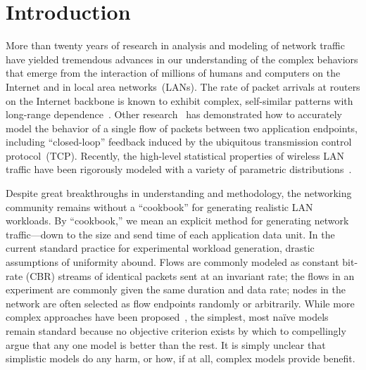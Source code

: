 \documentclass[conference]{IEEEtran}
\newcommand{\caps}[1]{{\small{#1}}}
\begin{document}
\section{Introduction}\label{sec:intro}



More than twenty years of research in analysis and modeling of network traffic have yielded tremendous advances in our understanding of the complex behaviors that emerge from the interaction of millions of humans and computers on the Internet and in local area networks~(\caps{LAN}s). The rate of packet arrivals at routers on the Internet backbone is known to exhibit complex, self-similar patterns with long-range dependence~\cite{Paxson95,Paxson96,Willinger98}. Other research~\cite{Hernandez06:dissertation} has demonstrated how to accurately model the behavior of a single flow of packets between two application endpoints, including ``closed-loop'' feedback induced by the ubiquitous transmission control protocol~(\caps{TCP}). Recently, the high-level statistical properties of wireless \caps{LAN} traffic have been rigorously modeled with a variety of parametric distributions~\cite{Hernandez06:wlan-traffic}.

Despite great breakthroughs in understanding and methodology, the networking community remains without a ``cookbook'' for generating realistic \caps{LAN} workloads. By ``cookbook,'' we mean an explicit method for generating network traffic---down to the size and send time of each application data unit. In the current standard practice for experimental workload generation, drastic assumptions of uniformity abound. Flows are commonly modeled as constant bit-rate (\caps{CBR}) streams of identical packets sent at an invariant rate; the flows in an experiment are commonly given the same duration and data rate; nodes in the network are often selected as flow endpoints randomly or arbitrarily. While more complex approaches have been proposed~\cite{Sommers04,Avallone04,Avallone06}, %
the simplest, most na\"ive models remain standard because no objective criterion exists by which to compellingly argue that any one model is better than the rest. It is simply unclear that simplistic models do any harm, or how, if at all, complex models provide benefit.
\end{document}
